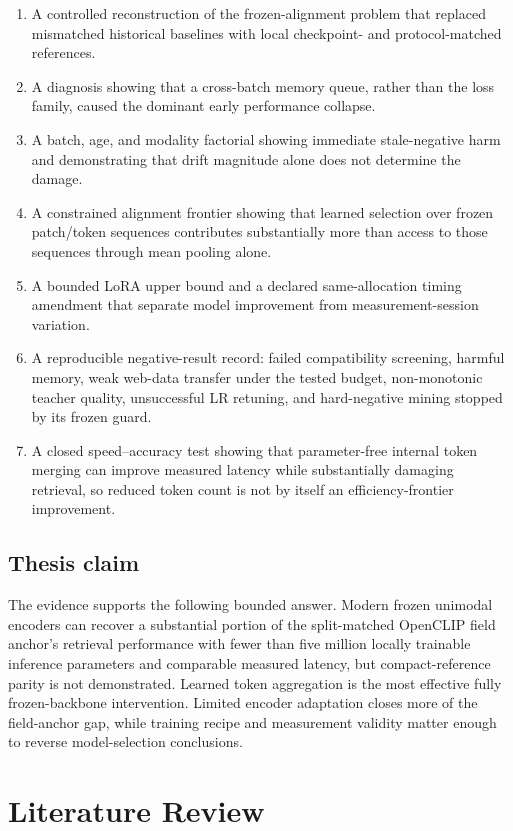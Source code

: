 \documentclass[11pt,a4paper,oneside]{report}
\begin{document}
\begin{enumerate}
\item A controlled reconstruction of the frozen-alignment problem that replaced mismatched historical baselines with local checkpoint- and protocol-matched references.
\item A diagnosis showing that a cross-batch memory queue, rather than the loss family, caused the dominant early performance collapse.
\item A batch, age, and modality factorial showing immediate stale-negative harm and demonstrating that drift magnitude alone does not determine the damage.
\item A constrained alignment frontier showing that learned selection over frozen patch/token sequences contributes substantially more than access to those sequences through mean pooling alone.
\item A bounded LoRA upper bound and a declared same-allocation timing amendment that separate model improvement from measurement-session variation.
\item A reproducible negative-result record: failed compatibility screening, harmful memory, weak web-data transfer under the tested budget, non-monotonic teacher quality, unsuccessful LR retuning, and hard-negative mining stopped by its frozen guard.
\item A closed speed--accuracy test showing that parameter-free internal token merging can improve measured latency while substantially damaging retrieval, so reduced token count is not by itself an efficiency-frontier improvement.
\end{enumerate}
\section{Thesis claim}
The evidence supports the following bounded answer. Modern frozen unimodal encoders can recover a substantial portion of the split-matched OpenCLIP field anchor's retrieval performance with fewer than five million locally trainable inference parameters and comparable measured latency, but compact-reference parity is not demonstrated. Learned token aggregation is the most effective fully frozen-backbone intervention. Limited encoder adaptation closes more of the field-anchor gap, while training recipe and measurement validity matter enough to reverse model-selection conclusions.

\chapter{Literature Review}
\end{document}
